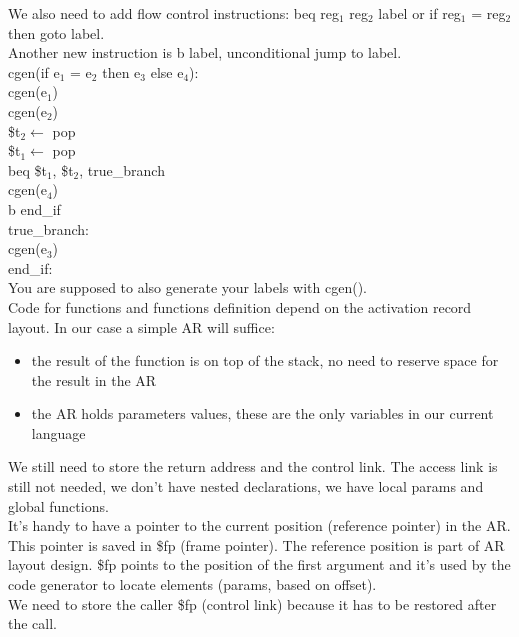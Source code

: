 \documentclass[12pt]{article}
\begin{document}
We also need to add flow control instructions: beq reg$_1$ reg$_2$ label or if reg$_1$ = reg$_2$ then goto label.
\\ Another new instruction is b label, unconditional jump to label.
\\ cgen(if e$_1$ = e$_2$ then e$_3$ else e$_4$): 
\\ \hspace*{4mm} cgen(e$_1$)
\\ \hspace*{4mm} cgen(e$_2$)
\\ \hspace*{4mm} \$t$_2 \leftarrow$ pop 
\\ \hspace*{4mm} \$t$_1 \leftarrow$ pop 
\\ \hspace*{4mm} beq \$t$_1$, \$t$_2$, true\_branch
\\ \hspace*{4mm} cgen(e$_4$) 
\\ \hspace*{4mm} b end\_if 
\\ true\_branch: 
\\ \hspace*{4mm} cgen(e$_3$) 
\\ end\_if:
\\ You are supposed to also generate your labels with cgen().
\\ Code for functions and functions definition depend on the activation record layout.
In our case a simple AR will suffice: 
\begin{itemize}
    \item the result of the function is on top of the stack, no need to reserve space for the result in the AR
    \item the AR holds parameters values, these are the only variables in our current language
\end{itemize}
We still need to store the return address and the control link. The access link is still not needed, we don't have nested declarations, we have local params and global functions.
\\ It's handy to have a pointer to the current position (reference pointer) in the AR.
This pointer is saved in \$fp (frame pointer).
The reference position is part of AR layout design. \$fp points to the position of the first argument and it's used by the code generator to locate elements (params, based on offset).
\\ We need to store the caller \$fp (control link) because it has to be restored after the call.
\end{document}
